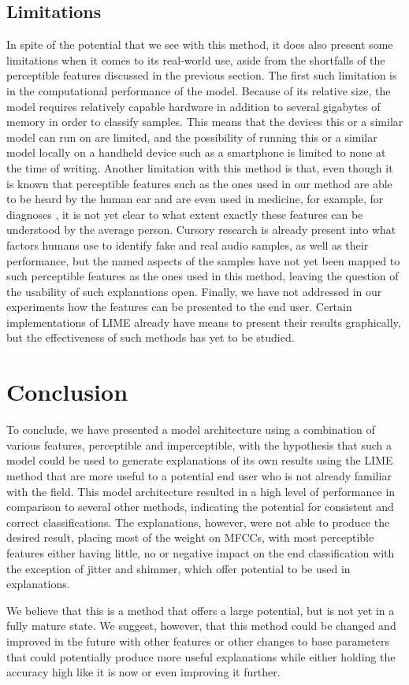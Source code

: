 \documentclass{article}
\begin{document}
		\subsection{Limitations}
		In spite of the potential that we see with this method, it does also present some
		limitations when it comes to its real-world use, aside from the shortfalls of the
		perceptible features discussed in the previous section. The first such limitation is in
		the computational performance of the model. Because of its relative size, the model
		requires relatively capable hardware in addition to several gigabytes of memory in order
		to classify samples. This means that the devices this or a similar model can run on are
		limited, and the possibility of running this or a similar model locally on a handheld
		device such as a smartphone is limited to none at the time of writing. Another limitation
		with this method is that, even though it is known that perceptible features such as the
		ones used in our method are able to be heard by the human ear and are even used in
		medicine, for example, for diagnoses \cite{chaiwongyen_deepfake-speech_2023}, it is not
		yet clear to what extent exactly these features can be understood by the average person.
		Cursory research \cite{warren_better_2024,sharevski_blind_2024} is already present into
		what factors humans use to identify fake and real audio samples, as well as their
		performance, but the named aspects of the samples have not yet been mapped to such
		perceptible features as the ones used in this method, leaving the question of the
		usability of such explanations open. Finally, we have not addressed in our experiments how
		the features can be presented to the end user. Certain implementations of LIME already
		have means to present their results graphically, but the effectiveness of such methods has
		yet to be studied.
	\section{Conclusion}
	To conclude, we have presented a model architecture using a combination of various features,
	perceptible and imperceptible, with the hypothesis that such a model could be used to generate
	explanations of its own results using the LIME method that are more useful to a potential end
	user who is not already familiar with the field. This model architecture resulted in a high
	level of performance in comparison to several other methods, indicating the potential for
	consistent and correct classifications. The explanations, however, were not able to produce
	the desired result, placing most of the weight on MFCCs, with most perceptible features either
	having little, no or negative impact on the end classification with the exception of jitter
	and shimmer, which offer potential to be used in explanations.
	\par
	We believe that this is a method that offers a large potential, but is not yet in a fully
	mature state. We suggest, however, that this method could be changed and improved in the
	future with other features or other changes to base parameters that could potentially produce
	more useful explanations while either holding the accuracy high like it is now or even
	improving it further.
	\newpage
	\sloppy
	\printbibliography
\end{document}
